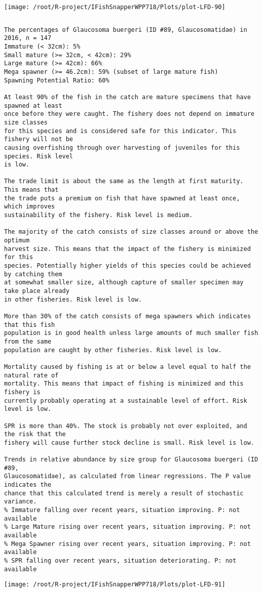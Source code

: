 \documentclass{report}\usepackage[]{graphicx}\usepackage[]{color}
\makeatletter
\def\maxwidth{ %
  \ifdim\Gin@nat@width>\linewidth
    \linewidth
  \else
    \Gin@nat@width
  \fi
}
\newenvironment{kframe}{%
 \def\at@end@of@kframe{}%
 \ifinner\ifhmode%
  \def\at@end@of@kframe{\end{minipage}}%
  \begin{minipage}{\columnwidth}%
 \fi\fi%
 \def\FrameCommand##1{\hskip\@totalleftmargin \hskip-\fboxsep
 \colorbox{shadecolor}{##1}\hskip-\fboxsep
     \hskip-\linewidth \hskip-\@totalleftmargin \hskip\columnwidth}%
 \MakeFramed {\advance\hsize-\width
   \@totalleftmargin\z@ \linewidth\hsize
   \@setminipage}}%
 {\par\unskip\endMakeFramed%
 \at@end@of@kframe}
\newenvironment{knitrout}{}{} %
\makeatother
\begin{document}
\begin{knitrout}
\texttt{[image: /root/R-project/IFishSnapperWPP718/Plots/plot-LFD-90]} 
\begin{kframe}\begin{verbatim}
\end{verbatim}
\end{kframe}
\clearpage
\newpage
\begin{kframe}\begin{verbatim}The percentages of Glaucosoma buergeri (ID #89, Glaucosomatidae) in 2016, n = 147
Immature (< 32cm): 5%
Small mature (>= 32cm, < 42cm): 29%
Large mature (>= 42cm): 66%
Mega spawner (>= 46.2cm): 59% (subset of large mature fish)
Spawning Potential Ratio: 60%
 
At least 90% of the fish in the catch are mature specimens that have spawned at least
once before they were caught. The fishery does not depend on immature size classes
for this species and is considered safe for this indicator. This fishery will not be
causing overfishing through over harvesting of juveniles for this species. Risk level
is low.

The trade limit is about the same as the length at first maturity.  This means that
the trade puts a premium on fish that have spawned at least once, which improves
sustainability of the fishery. Risk level is medium.

The majority of the catch consists of size classes around or above the optimum
harvest size. This means that the impact of the fishery is minimized for this
species. Potentially higher yields of this species could be achieved by catching them
at somewhat smaller size, although capture of smaller specimen may take place already
in other fisheries. Risk level is low.

More than 30% of the catch consists of mega spawners which indicates that this fish
population is in good health unless large amounts of much smaller fish from the same
population are caught by other fisheries. Risk level is low.
 
Mortality caused by fishing is at or below a level equal to half the natural rate of
mortality. This means that impact of fishing is minimized and this fishery is
currently probably operating at a sustainable level of effort. Risk level is low.
 
SPR is more than 40%. The stock is probably not over exploited, and the risk that the
fishery will cause further stock decline is small. Risk level is low.
 
Trends in relative abundance by size group for Glaucosoma buergeri (ID #89,
Glaucosomatidae), as calculated from linear regressions. The P value indicates the
chance that this calculated trend is merely a result of stochastic variance.
% Immature falling over recent years, situation improving. P: not available
% Large Mature rising over recent years, situation improving. P: not available
% Mega Spawner rising over recent years, situation improving. P: not available
% SPR falling over recent years, situation deteriorating. P: not available
\end{verbatim}
\end{kframe}
\texttt{[image: /root/R-project/IFishSnapperWPP718/Plots/plot-LFD-91]} 


\end{knitrout}
\end{document}
